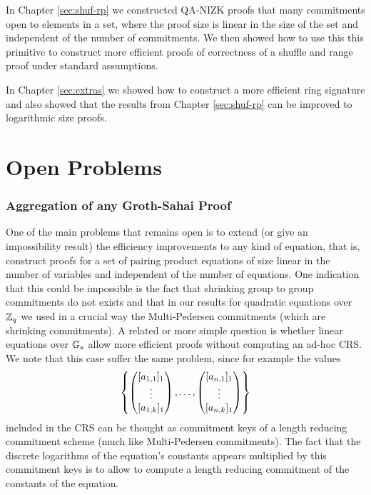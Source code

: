 In Chapter \ref{sec:shuf-rp} we constructed QA-NIZK proofs that many commitments open to elements in a set, where the proof size is linear in the size of the set and independent of the number of commitments. We then showed how to use this this primitive to construct more efficient proofs of correctness of a shuffle and range proof under standard assumptions.

In Chapter \ref{sec:extras} we showed how to construct a more efficient ring signature and also showed that the results from Chapter \ref{sec:shuf-rp} can be improved to logarithmic size proofs.

\section{Open Problems}

\subsubsection{Aggregation of any Groth-Sahai Proof}
One of the main problems that remains open is to extend (or give an impossibility result) the efficiency improvements to any kind of equation, that is, construct proofs for a set of pairing product equations of size linear in the number of variables and independent of the number of equations. One indication that this could be impossible is the fact that shrinking group to group commitments do not exists \cite{EC:AbeHarOhk12} and that in our results for quadratic equations over $\mathbb{Z}_q$ we used in a crucial way the Multi-Pedersen commitments (which are shrinking commitments). A related or more simple question is whether linear equations over $\mathbb{G}_s$ allow more efficient proofs without computing an ad-hoc CRS. We note that this case suffer the same problem, since for example the values 
$$\left\{\left(\begin{matrix}{[a_{1,1}]_1}\\\vdots\\{[a_{1,k}]_1}\end{matrix}\right),\ldots,\left(\begin{matrix}{[a_{n,1}]_1}\\\vdots\\{[a_{n,k}]_1}\end{matrix}\right)\right\}$$
included in the CRS can be thought as commitment keys of a length reducing commitment scheme (much like Multi-Pedersen commitments). The fact that the discrete logarithms of the equation's constants appears multiplied by this commitment keys is to allow to compute a length reducing commitment of the constants of the equation.

